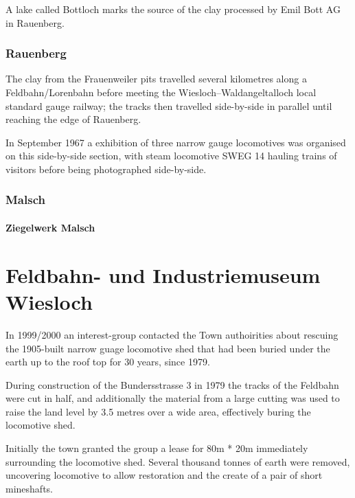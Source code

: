 \documentclass[a4paper]{report}
\begin{document}
A lake called Bottloch marks the source of the clay processed by Emil
Bott AG in Rauenberg.\cite{Rothenhoefer-bott-2016}

\section{Rauenberg}

The clay from the Frauenweiler pits travelled several kilometres along
a Feldbahn/Lorenbahn before meeting the Wiesloch--Waldangeltalloch
local standard gauge railway; the tracks then travelled side-by-side
in parallel until reaching the edge of
Rauenberg.\cite{Rothenhoefer-bott-2016}

In September 1967 a exhibition of three narrow gauge locomotives was
organised on this side-by-side section, with steam locomotive SWEG 14
hauling trains of visitors before being photographed side-by-side.\cite{Freundkreis-8}

\section{Malsch}

\subsection{Ziegelwerk Malsch}

\part{Feldbahn- und Industriemuseum Wiesloch}

In 1999/2000 an interest-group contacted the Town authoirities about
rescuing the 1905-built narrow guage locomotive shed that had been
buried under the earth up to the roof top for 30 years, since 1979.

During construction of the Bundersstrasse 3 in 1979 the tracks of the Feldbahn were cut in half, and additionally the material from a large cutting was used to raise the land level by 3.5 metres over a wide area, effectively buring the locomotive shed.

Initially the town granted the group a lease for 80m * 20m immediately
surrounding the locomotive shed.  Several thousand tonnes of earth
were removed, uncovering locomotive to allow restoration and the
create of a pair of short mineshafts.
\end{document}
